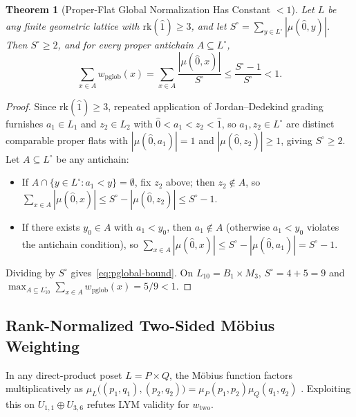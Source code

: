 \documentclass[11pt]{article}
\newtheorem{theorem}{Theorem}[section]
\theoremstyle{definition}
\theoremstyle{remark}
\newcommand{\rk}{\mathrm{rk}}
\begin{document}
\begin{theorem}[Proper-Flat Global Normalization Has Constant $< 1$]\label{thm:pglobal}
Let $L$ be any finite geometric lattice with $\rk(\hat{1}) \ge 3$, and let $S^\circ = \sum_{y \in L^\circ} |\mu(\hat{0}, y)|$. Then $S^\circ \ge 2$, and for every proper antichain $A \subseteq L^\circ$,
\begin{equation}\label{eq:pglobal-bound}
  \sum_{x \in A} w_{\mathrm{pglob}}(x) = \sum_{x \in A} \frac{|\mu(\hat{0}, x)|}{S^\circ} \le \frac{S^\circ - 1}{S^\circ} < 1.
\end{equation}
\end{theorem}
\begin{proof}
Since $\rk(\hat{1}) \ge 3$, repeated application of Jordan--Dedekind grading furnishes $a_1 \in L_1$ and $z_2 \in L_2$ with $\hat{0} < a_1 < z_2 < \hat{1}$, so $a_1, z_2 \in L^\circ$ are distinct comparable proper flats with $|\mu(\hat{0}, a_1)| = 1$ and $|\mu(\hat{0}, z_2)| \ge 1$, giving $S^\circ \ge 2$. Let $A \subseteq L^\circ$ be any antichain:
\begin{itemize}
\item If $A \cap \{y \in L^\circ : a_1 < y\} = \emptyset$, fix $z_2$ above; then $z_2 \notin A$, so $\sum_{x \in A} |\mu(\hat{0}, x)| \le S^\circ - |\mu(\hat{0}, z_2)| \le S^\circ - 1$.
\item If there exists $y_0 \in A$ with $a_1 < y_0$, then $a_1 \notin A$ (otherwise $a_1 < y_0$ violates the antichain condition), so $\sum_{x \in A} |\mu(\hat{0}, x)| \le S^\circ - |\mu(\hat{0}, a_1)| = S^\circ - 1$.
\end{itemize}
Dividing by $S^\circ$ gives~\eqref{eq:pglobal-bound}. On $L_{10} = B_1 \times M_3$, $S^\circ = 4 + 5 = 9$ and $\max_{A \subseteq L_{10}^\circ} \sum_{x \in A} w_{\mathrm{pglob}}(x) = 5/9 < 1$.
\end{proof}

\subsection{Rank-Normalized Two-Sided M\"obius Weighting}

In any direct-product poset $L = P \times Q$, the M\"obius function factors multiplicatively as $\mu_L\bigl((p_1,q_1),(p_2,q_2)\bigr) = \mu_P(p_1,p_2)\mu_Q(q_1,q_2)$ \cite[Proposition~5]{Rota1964}. Exploiting this on $U_{1,1} \oplus U_{3,6}$ refutes LYM validity for $w_{\mathrm{two}}$.
\end{document}
